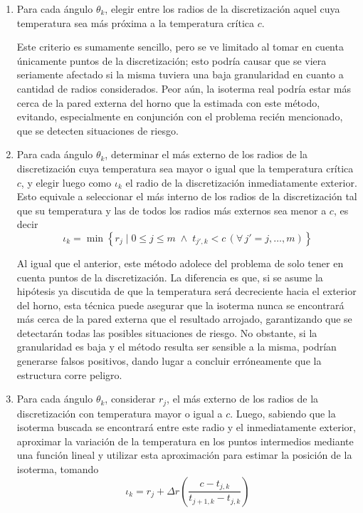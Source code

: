             \begin{enumerate}
                \item Para cada ángulo $\theta_k$, elegir entre los radios de la discretización aquel cuya temperatura sea más próxima a la temperatura crítica $c$.

                Este criterio es sumamente sencillo, pero se ve limitado al tomar en cuenta únicamente puntos de la discretización; esto podría causar que se viera seriamente afectado si la misma tuviera una baja granularidad en cuanto a cantidad de radios considerados. Peor aún, la isoterma real podría estar más cerca de la pared externa del horno que la estimada con este método, evitando, especialmente en conjunción con el problema recién mencionado, que se detecten situaciones de riesgo.

                \item Para cada ángulo $\theta_k$, determinar el más externo de los radios de la discretización cuya temperatura sea mayor o igual que la temperatura crítica $c$, y elegir luego como $\iota_k$ el radio de la discretización inmediatamente exterior. Esto equivale a seleccionar el más interno de los radios de la discretización tal que su temperatura y las de todos los radios más externos sea menor a $c$, es decir
                \[ \iota_k = \min \left\lbrace r_j \; \vert \; 0 \leq j \leq m \; \land \; t_{j',k} < c \, (\forall \, j' = j, \dots, m) \right\rbrace \]

                Al igual que el anterior, este método adolece del problema de solo tener en cuenta puntos de la discretización. La diferencia es que, si se asume la hipótesis ya discutida de que la temperatura será decreciente hacia el exterior del horno, esta técnica puede asegurar que la isoterma nunca se encontrará más cerca de la pared externa que el resultado arrojado, garantizando que se detectarán todas las posibles situaciones de riesgo. No obstante, si la granularidad es baja y el método resulta ser sensible a la misma, podrían generarse falsos positivos, dando lugar a concluir erróneamente que la estructura corre peligro.

                \item Para cada ángulo $\theta_k$, considerar $r_j$, el más externo de los radios de la discretización con temperatura mayor o igual a $c$. Luego, sabiendo que la isoterma buscada se encontrará entre este radio y el inmediatamente exterior, aproximar la variación de la temperatura en los puntos intermedios mediante una función lineal y utilizar esta aproximación para estimar la posición de la isoterma, tomando
                \[ \iota_k = r_j + \Delta r \left(\frac{c - t_{j,k}}{t_{j+1,k} - t_{j,k}} \right) \]


\end{enumerate}

